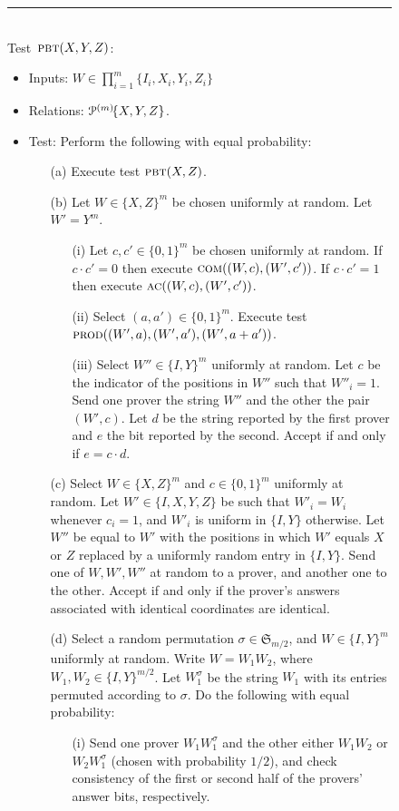 \begin{figure}[H]
\rule[1ex]{\textwidth}{0.5pt}\\
\justifying
Test~$\textsc{pbt}(X,Y,Z)$: 
\begin{itemize}
\item Inputs: $W\in\prod_{i=1}^m\{I_i,X_i,Y_i,Z_i\}$
\item Relations: $\mathcal{P}^{(m)}\!\{X,Y,Z\}$.  
\item Test: Perform the following with equal probability: 
\begin{enumerate}
\item[(a)] Execute test $\textsc{pbt}(X,Z)$. 
\item[(b)] Let $W\in\{X,Z\}^m$ be chosen uniformly at random. Let $W'=Y^m$. 
\begin{enumerate}
\item[(i)] Let $c,c'\in\{0,1\}^m$ be chosen uniformly at random. If $c\cdot c'=0$ then execute $\textsc{com}((W,c),(W',c'))$. If $c\cdot c'=1$ then execute $\textsc{ac}((W,c),(W',c'))$. 
\item[(ii)]  Select $(a,a')\in\{0,1\}^m$. Execute test $\textsc{prod}((W',a),(W',a'),(W',a+a'))$. 
\item[(iii)] Select $W''\in\{I,Y\}^m$ uniformly at random. Let $c$ be the indicator of the positions in $W''$ such that $W''_i=1$. Send one prover the string $W''$ and the other the pair $(W',c)$. Let $d$ be the string reported by the first prover and $e$ the bit reported by the second. Accept if and only if $e=c\cdot d$. 
\end{enumerate}
\item[(c)] Select $W\in\{X,Z\}^m$ and $c\in\{0,1\}^m$ uniformly at random. Let $W'\in\{I,X,Y,Z\}$ be such that $W'_i=W_i$ whenever $c_i=1$, and $W'_i$ is uniform in $\{I,Y\}$ otherwise. Let $W''$ be equal to $W'$ with the positions in which $W'$ equals $X$ or $Z$ replaced by a uniformly random entry in $\{I,Y\}$. Send one of $W,W',W''$ at random to a prover, and another one to the other. Accept if and only if the prover's answers associated with identical coordinates are identical. 
\item[(d)] Select a random permutation  $\sigma \in \mathfrak{S}_{m/2}$, and $W\in  \{I,Y\}^m$ uniformly at random. Write $W=W_1 W_2$, where $W_1,W_2\in \{I,Y\}^{m/2}$. Let $W_1^\sigma$ be the string $W_1$ with its entries permuted according to $\sigma$. Do the following with equal probability: 
\begin{enumerate}
\item[(i)] Send one prover $W_1 W_1^\sigma$ and the other either $W_1 W_2$ or $W_2W_1^\sigma$ (chosen with probability $1/2$), and check consistency of the first or second half of the provers' answer bits, respectively.

\end{enumerate}
\end{enumerate}
\end{itemize}
\end{figure}
